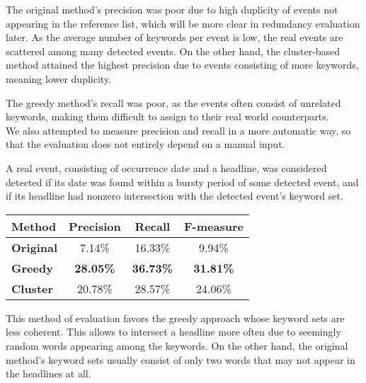 \hspace{\fill}

The original method's precision was poor due to high duplicity of events not appearing in the reference list, which will be more clear in redundancy evaluation later. As the average number of keywords per event is low, the real events are scattered among many detected events. On the other hand, the cluster-based method attained the highest precision due to events consisting of more keywords, meaning lower duplicity.

The greedy method's recall was poor, as the events often consist of unrelated keywords, making them difficult to assign to their real world counterparts.\\

We also attempted to measure precision and recall in a more automatic way, so that the evaluation does not entirely depend on a manual input.

A real event, consisting of occurrence date and a headline, was considered detected if its date was found within a bursty period of some detected event, and if its headline had nonzero intersection with the detected event's keyword set.

\hspace{\fill}

\begin{minipage}{\linewidth}
\centering
\begin{tabular}{ l c c c }\toprule[1.5pt]
\bf Method 	 & \bf Precision & \bf Recall & \bf F-measure \\ \midrule
\bf Original &  7.14\%     & 16.33\%     &  9.94\% \\
\bf Greedy   &  \bf 28.05\%     & \bf 36.73\%      &  \bf 31.81\% \\
\bf Cluster &  20.78\%     & 28.57\%      &  24.06\% \\ \bottomrule[1.25pt]
\end {tabular}\par
{} \label{tab:title} 
\end{minipage}

\hspace{\fill}

This method of evaluation favors the greedy approach whose keyword sets are less coherent. This allows to intersect a headline more often due to seemingly random words appearing among the keywords. On the other hand, the original method's keyword sets usually consist of only two words that may not appear in the headlines at all.

